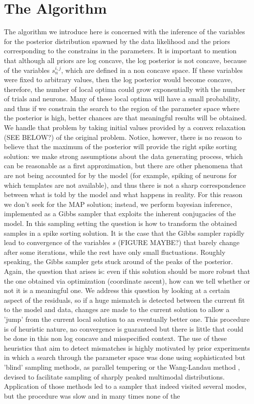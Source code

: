 \documentclass[12pt,letterpaper,fleqn]{article}
\begin{document}
\section{The Algorithm}
The algorithm we introduce here is concerned with the inference of the variables for the posterior distribution spawned by the data likelihood and the priors corresponding to the constrains in the parameters. It is important to mention that although all priors are log concave, the log posterior is not concave, because of the variables $s_n^{i,j}$, which are defined in a non concave space. If these variables were fixed to arbitrary values, then the log posterior would become concave, therefore, the number of local optima could grow exponentially with the number of trials and neurons. Many of these local optima will have a small probability, and thus if we constrain the search to the region of the parameter space where the posterior is high, better chances are that meaningful results will be obtained. We handle that problem by taking initial values provided by a convex relaxation (SEE BELOW?) of the original problem. Notice, however, there is no reason to believe that the maximum of the posterior will provide the right spike sorting solution: we make strong assumptions about the data generating process, which can be reasonable as a first approximation, but there are other phenomena that are not being accounted for by the model (for example, spiking of neurons for which templates are not available), and thus there is not a sharp correspondence between what is told by the model and what happens in reality. For this reason we don't seek for the MAP solution; instead, we perform bayesian inference, implemented as a Gibbs sampler \cite{Geman84} that exploits the inherent conjugacies of the model. In this sampling setting the question is how to transform the obtained samples in a spike sorting solution. It is the case that the Gibbs sampler rapidly lead to convergence of the variables $s$ (FIGURE MAYBE?) that barely change after some iterations, while the rest have only small fluctuations. Roughly speaking, the Gibbs sampler gets stuck around of the peaks of the posterior. Again, the question that arises is: even if this solution should be more robust that the one obtained via optimization (coordinate ascent), how can we tell whether or not it is a meaningful one. We address this question by looking at a certain aspect of the residuals, so if a huge mismatch is detected between the current fit to the model and data, changes are made to the current solution to allow a 'jump' from the current local solution to an eventually better one. This procedure is of heuristic nature, no convergence is guaranteed but there is little that could be done in this non log concave and misspecified context. The use of these heuristics that aim to detect mismatches is highly motivated by prior experiments in which a search through the parameter space was done using sophisticated but 'blind' sampling methods, as parallel tempering \cite{Earl05} or the Wang-Landau method \cite{Atchade10}, devised to facilitate sampling of sharply peaked multimodal distributions. Application of those methods led to a sampler that indeed visited several modes, but the procedure was slow and in many times none of the 
\end{document}
